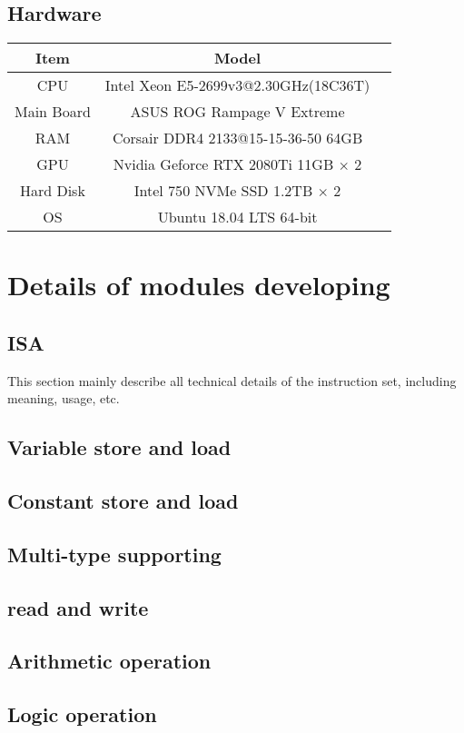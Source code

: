 \documentclass{article}
\begin{document}
		\subsection{Hardware}
			\begin{center}
			\begin{tabular}{ccc}
			\toprule
			Item & Model \\
			\midrule
			CPU & Intel Xeon E5-2699v3@2.30GHz(18C36T) \\
			Main Board & ASUS ROG Rampage V Extreme \\
			RAM & Corsair DDR4 2133@15-15-36-50 64GB \\
			GPU & Nvidia Geforce RTX 2080Ti 11GB $ \times $ 2 \\
			Hard Disk & Intel 750 NVMe SSD 1.2TB $ \times $ 2 \\
			OS & Ubuntu 18.04 LTS 64-bit \\
			\bottomrule
			\end{tabular}
			\end{center}
		\section{Details of modules developing}
		\subsection{ISA}
		This section mainly describe all technical details of the instruction set, including meaning, usage, etc. 
		\subsection{Variable store and load}
		\subsection{Constant store and load}
		\subsection{Multi-type supporting}
		\subsection{read and write}
		\subsection{Arithmetic operation}
		\subsection{Logic operation}
\end{document}
